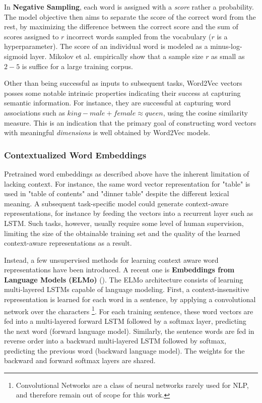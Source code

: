 In \textbf{Negative Sampling}, each word is assigned with a \emph{score} rather a probability. The model objective then aims to separate the score of the correct word from the rest, by maximizing the difference between the correct score and the sum of scores assigned to $r$ incorrect words sampled from the vocabulary ($r$ is a hyperparameter). The score of an individual word is modeled as a minus-log-sigmoid layer. Mikolov et al. empirically show that a sample size $r$ as small as $2 - 5$ is suffice for a large training corpus. 

Other than being successful as inputs to subsequent tasks, Word2Vec vectors posses some notable intrinsic properties indicating their success at capturing semantic information. For instance, they are successful at capturing word associations such as $king - male + female \approx queen$, using the cosine similarity measure. This is an indication that the primary goal of constructing word vectors with meaningful \emph{dimensions} is well obtained by Word2Vec models.

\subsubsection{Contextualized Word Embeddings}
Pretrained word embeddings as described above have the inherent limitation of lacking context. For instance, the same word vector representation for "table" is used in "table of contents" and "dinner table" despite the different lexical meaning. A subsequent task-specific model could generate context-aware representations, for instance by feeding the vectors into a recurrent layer such as LSTM. Such tasks, however, usually require some level of human supervision, limiting the size of the obtainable training set and the quality of the learned context-aware representations as a result. 

Instead, a few unsupervised methods for learning context aware word representations have been introduced. A recent one is \textbf{Embeddings from Language Models (ELMo)} (\cite{elmo}). The ELMo architecture consists of learning multi-layered LSTMs capable of language modeling. First, a context-insensitive representation is learned for each word in a sentence, by applying a convolutional network over the characters \footnote{Convolutional Networks are a class of neural networks rarely used for NLP, and therefore remain out of scope for this work.}. For each training sentence, these word vectors are fed into a multi-layered forward LSTM followed by a softmax layer, predicting the next word (forward language model). Similarly, the sentence words are fed in reverse order into a backward multi-layered LSTM followed by softmax, predicting the previous word (backward language model). The weights for the backward and forward softmax layers are shared. 

